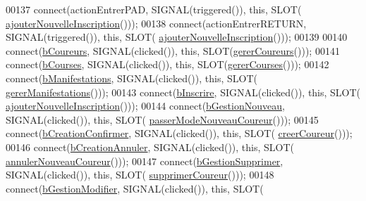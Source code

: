 \begin{DoxyCode}
00137     connect(actionEntrerPAD, SIGNAL(triggered()), \textcolor{keyword}{this}, SLOT(
      \hyperlink{class_i_h_m_gestion_cross_af0165d32344af78b4edce59f88c90ff6}{ajouterNouvelleInscription}()));
00138     connect(actionEntrerRETURN, SIGNAL(triggered()), \textcolor{keyword}{this}, SLOT(
      \hyperlink{class_i_h_m_gestion_cross_af0165d32344af78b4edce59f88c90ff6}{ajouterNouvelleInscription}()));
00139 
00140     connect(\hyperlink{class_i_h_m_gestion_cross_ac2819198bae00b7e0f23e8bc491b4cbb}{bCoureurs}, SIGNAL(clicked()), \textcolor{keyword}{this}, SLOT(\hyperlink{class_i_h_m_gestion_cross_ad46a2295500cf98dbc18f862f6020103}{gererCoureurs}()));
00141     connect(\hyperlink{class_i_h_m_gestion_cross_a0df377aec07ada51a115cc458854c966}{bCourses}, SIGNAL(clicked()), \textcolor{keyword}{this}, SLOT(\hyperlink{class_i_h_m_gestion_cross_a82e3861f4959d3599d1d85ee0b3b8654}{gererCourses}()));
00142     connect(\hyperlink{class_i_h_m_gestion_cross_a540b4525e546b6d61988245ae53768ce}{bManifestations}, SIGNAL(clicked()), \textcolor{keyword}{this}, SLOT(
      \hyperlink{class_i_h_m_gestion_cross_a406efb83dac8a8ac5d04e9b8cbeaf316}{gererManifestations}()));
00143     connect(\hyperlink{class_i_h_m_gestion_cross_a1afbc04ebd42deafebbbdc998d0fc246}{bInscrire}, SIGNAL(clicked()), \textcolor{keyword}{this}, SLOT(
      \hyperlink{class_i_h_m_gestion_cross_af0165d32344af78b4edce59f88c90ff6}{ajouterNouvelleInscription}()));
00144     connect(\hyperlink{class_i_h_m_gestion_cross_ab987235a79961d3d186878052a02b21b}{bGestionNouveau}, SIGNAL(clicked()), \textcolor{keyword}{this}, SLOT(
      \hyperlink{class_i_h_m_gestion_cross_ac8f336c95a5f0c9eb8a4bc1c4bb83445}{passerModeNouveauCoureur}()));
00145     connect(\hyperlink{class_i_h_m_gestion_cross_aac8a7363e20bc9ba2f65b7d9b3bc856e}{bCreationConfirmer}, SIGNAL(clicked()), \textcolor{keyword}{this}, SLOT(
      \hyperlink{class_i_h_m_gestion_cross_a6000b152ba3febb45d6c409519168ba2}{creerCoureur}()));
00146     connect(\hyperlink{class_i_h_m_gestion_cross_a297a77054dc0f54e461c0f9b0382efb3}{bCreationAnnuler}, SIGNAL(clicked()), \textcolor{keyword}{this}, SLOT(
      \hyperlink{class_i_h_m_gestion_cross_a1bf6838771bef4796def7a5ba58d74b3}{annulerNouveauCoureur}()));
00147     connect(\hyperlink{class_i_h_m_gestion_cross_adc5bed6caf7f597dd30999bc871e695b}{bGestionSupprimer}, SIGNAL(clicked()), \textcolor{keyword}{this}, SLOT(
      \hyperlink{class_i_h_m_gestion_cross_a4fd00fda0e47366d66d046e344a1617e}{supprimerCoureur}()));
00148     connect(\hyperlink{class_i_h_m_gestion_cross_a524ced9992dcc4e7ee25b01e30c4c5df}{bGestionModifier}, SIGNAL(clicked()), \textcolor{keyword}{this}, SLOT(

\end{DoxyCode}
